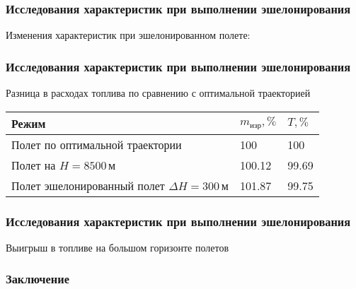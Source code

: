 \documentclass{beamer}
\begin{document}
\begin{frame}[t]
    \frametitle{Исследования характеристик при выполнении эшелонирования}
    \begin{center}
        Изменения характеристик при эшелонированном полете: 

        \begin{minipage}{0.49\textwidth}
            \centering
        \end{minipage}
        \hfill
        \begin{minipage}{0.49\textwidth}
            \centering
        \end{minipage}
    \end{center}
\end{frame}


\begin{frame}[t]
    \frametitle{Исследования характеристик при выполнении эшелонирования}
    \begin{center}
    Разница в расходах топлива по сравнению с оптимальной траекторией

\begin{tabular}{|p{}|p{}|p{}|}
    \hline
    Режим & $m_{изр}, \%$ & $T, \%$\\
    \hline
    Полет по оптимальной траектории & 100 & 100 \\
    \hline
    Полет на $H=8500\,м$ & 100.12 & 99.69\\
    \hline
    Полет эшелонированный полет $\Delta H =300\, м$ & 101.87 & 99.75\\
    \hline
\end{tabular}
    \end{center}
\end{frame}

\begin{frame}[t]
    \frametitle{Исследования характеристик при выполнении эшелонирования}
    \begin{center}
        Выигрыш в топливе на большом горизонте полетов
        \resizebox{0.8\textwidth}{!}{}
    \end{center}
\end{frame}

\begin{frame}[t]
    \frametitle{Заключение}
    
\end{frame}
\end{document}
